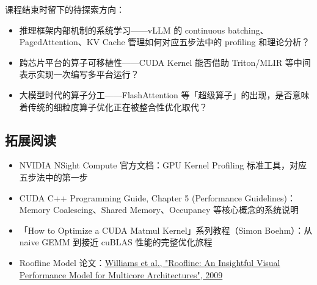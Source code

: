 \documentclass[a4paper]{article}
\begin{document}
课程结束时留下的待探索方向：

\begin{itemize}
    \item 推理框架内部机制的系统学习——vLLM 的 continuous batching、PagedAttention、KV Cache 管理如何对应五步法中的 profiling 和理论分析？
    \item 跨芯片平台的算子可移植性——CUDA Kernel 能否借助 Triton/MLIR 等中间表示实现一次编写多平台运行？
    \item 大模型时代的算子分工——FlashAttention 等「超级算子」的出现，是否意味着传统的细粒度算子优化正在被整合性优化取代？
\end{itemize}

\subsection{拓展阅读}

\begin{itemize}
    \item NVIDIA NSight Compute 官方文档：GPU Kernel Profiling 标准工具，对应五步法中的第一步
    \item CUDA C++ Programming Guide, Chapter 5 (Performance Guidelines)：Memory Coalescing、Shared Memory、Occupancy 等核心概念的系统说明
    \item 「How to Optimize a CUDA Matmul Kernel」系列教程（Simon Boehm）：从 naive GEMM 到接近 cuBLAS 性能的完整优化旅程
    \item Roofline Model 论文：\href{https://crd.lbl.gov/assets/pubs\_presos/parlab08-roofline-talk.pdf}{Williams et al., "Roofline: An Insightful Visual Performance Model for Multicore Architectures", 2009}
\end{itemize}
\end{document}
